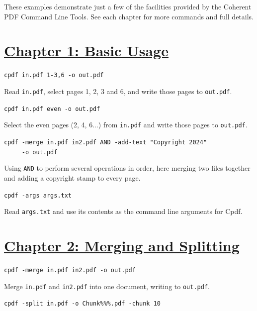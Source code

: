 \documentclass{book}
\begin{document}
These examples demonstrate just a few of the facilities provided by the Coherent PDF Command Line Tools. See each chapter for more commands and full details.

\section*{\hyperref[chap:1]{Chapter 1: Basic Usage}}

\begin{framed}\noindent\texttt{cpdf in.pdf 1-3,6 -o out.pdf}\end{framed}

\noindent Read \texttt{in.pdf}, select pages 1, 2, 3 and 6, and write those pages to \texttt{out.pdf}.


\begin{framed}\noindent\texttt{cpdf in.pdf even -o out.pdf}\end{framed}
                  
\noindent Select the even pages (2, 4, 6...) from \texttt{in.pdf} and write those pages to \texttt{out.pdf}.

\begin{framed}
 \noindent\small\verb?cpdf -merge in.pdf in2.pdf AND -add-text "Copyright 2024"?\\
 \noindent\small\verb?     -o out.pdf?
\end{framed}

\noindent Using \texttt{AND} to perform several operations in order, here merging two files together and adding a copyright stamp to every page.

\begin{framed}\noindent\texttt{cpdf -args args.txt}\end{framed}

\noindent Read \texttt{args.txt} and use its contents as the command line arguments for Cpdf.

\section*{\hyperref[chap:2]{Chapter 2: Merging and Splitting}}

\begin{framed}\noindent\texttt{cpdf -merge in.pdf in2.pdf -o out.pdf}\end{framed}

\noindent Merge \texttt{in.pdf} and \texttt{in2.pdf} into one document, writing to \texttt{out.pdf}.

\begin{framed}\noindent\texttt{cpdf -split in.pdf -o Chunk\%\%\%.pdf -chunk 10}\end{framed}
\end{document}
